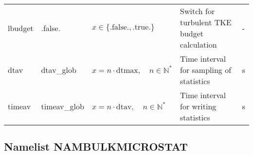 \documentclass[twoside,11pt,fleqn,a4paper,english,openright]{report}
\begin{document}
\begin{center}
  \tablelasttail{
        &&&&\\\hline
  }
\begin{supertabular}{|l|p{2cm}|p{4cm}|p{6cm}|l|}
  lbudget	& .false.	& $x\in\{\text{.false.},\text{.true.}\}$		& Switch for turbulent TKE budget calculation	& -\\
  dtav		& dtav\_glob	& $x = n \cdot \text{dtmax}, \quad n \in \mathbb{N}^*$	& Time interval for sampling of statistics	& s\\
  timeav	& timeav\_glob	& $x = n \cdot \text{dtav}, \quad n \in \mathbb{N}^*$	& Time interval for writing statistics		& s\\
\end{supertabular}
\end{center}

\newpage
\subsection{Namelist NAMBULKMICROSTAT}\label{par:bulkmicrostat}
\end{document}
